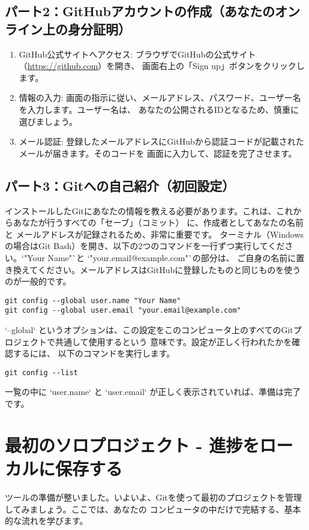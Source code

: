 \documentclass{ltjsarticle}
\begin{document}
\subsection{パート2：GitHubアカウントの作成（あなたのオンライン上の身分証明）}
\begin{enumerate}
    \item GitHub公式サイトへアクセス: ブラウザでGitHubの公式サイト（\url{https://github.com}）を開き、
		画面右上の「Sign up」ボタンをクリックします。
    \item 情報の入力: 画面の指示に従い、メールアドレス、パスワード、ユーザー名を入力します。ユーザー名は、
		あなたの公開されるIDとなるため、慎重に選びましょう。
    \item メール認証: 登録したメールアドレスにGitHubから認証コードが記載されたメールが届きます。そのコードを
		画面に入力して、認証を完了させます。
\end{enumerate}

\subsection{パート3：Gitへの自己紹介（初回設定）}
インストールしたGitにあなたの情報を教える必要があります。これは、これからあなたが行うすべての「セーブ」（コミット）
に、作成者としてあなたの名前と
メールアドレスが記録されるため、非常に重要です。
ターミナル（Windowsの場合はGit Bash）を開き、以下の2つのコマンドを一行ずつ実行してください。`"Your Name"`と
`"your.email@example.com"`の部分は、
ご自身の名前に置き換えてください。メールアドレスはGitHubに登録したものと同じものを使うのが一般的です。
\begin{verbatim}
git config --global user.name "Your Name"
git config --global user.email "your.email@example.com"
\end{verbatim}
`--global` というオプションは、この設定をこのコンピュータ上のすべてのGitプロジェクトで共通して使用するという
意味です。設定が正しく行われたかを確認するには、
以下のコマンドを実行します。
\begin{verbatim}
git config --list
\end{verbatim}
一覧の中に `user.name` と `user.email` が正しく表示されていれば、準備は完了です。

\section{最初のソロプロジェクト - 進捗をローカルに保存する}
ツールの準備が整いました。いよいよ、Gitを使って最初のプロジェクトを管理してみましょう。ここでは、あなたの
コンピュータの中だけで完結する、基本的な流れを学びます。
\end{document}

